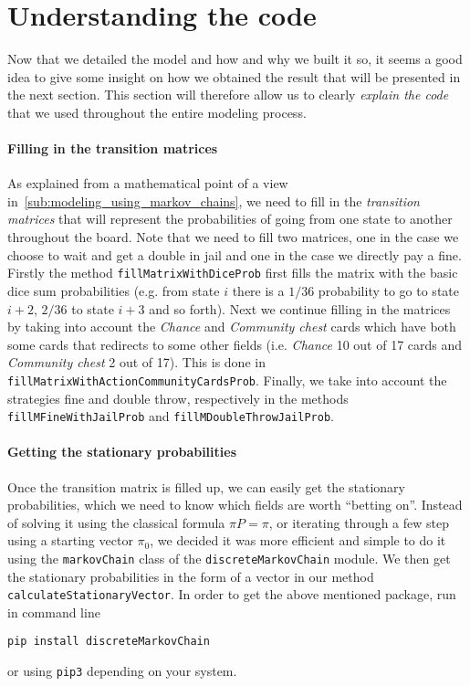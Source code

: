 \section{Understanding the code} %
\label{sec:understanding_the_code}
Now that we detailed the model and how and why we built it so,
it seems a good idea to give some insight on how we obtained
the result that will be presented in the next section.
This section will therefore allow us to clearly \emph{explain the code}
that we used throughout the entire modeling process.

\paragraph{Filling in the transition matrices} %
\label{par:filling_the_transition_matrices}
As explained from a mathematical point of a view 
in~\ref{sub:modeling_using_markov_chains}, we need to fill in the
\emph{transition matrices} that will represent the probabilities
of going from one state to another throughout the board.
Note that we need to fill two matrices, one in the case
we choose to wait and get a double in jail and one in the
case we directly pay a fine.
Firstly the method \lstinline|fillMatrixWithDiceProb| first fills the matrix
with the basic dice sum probabilities (e.g. from state $i$ there is a
$1/36$ probability to go to state $i+2$, $2/36$ to state $i+3$ and so
forth).
Next we continue filling in the matrices by taking into account
the \emph{Chance} and \emph{Community chest} cards which have both
some cards that redirects to some other fields (i.e. \emph{Chance} 10
out of 17 cards and \emph{Community chest} 2 out of 17).
This is done in \lstinline|fillMatrixWithActionCommunityCardsProb|.
Finally, we take into account the strategies fine and double throw,
respectively in the methods \lstinline|fillMFineWithJailProb|
and \lstinline|fillMDoubleThrowJailProb|.


\paragraph{Getting the stationary probabilities} %
\label{par:getting_the_stationary_probabilities}
Once the transition matrix is filled up, we can easily
get the stationary probabilities, which we need to know
which fields are worth \enquote{betting on}.
Instead of solving it using the classical formula $\pi P = \pi$,
or iterating through a few step using a starting vector $\pi_0$,
we decided it was more efficient and simple to do it using the 
\lstinline|markovChain| class of the \lstinline|discreteMarkovChain| module.
We then get the stationary probabilities in the form of a vector
in our method \lstinline|calculateStationaryVector|.
In order to get the above mentioned package, run in command line
\begin{center}
  \lstinline|pip install discreteMarkovChain|
\end{center}
or using \lstinline|pip3| depending on your system.

